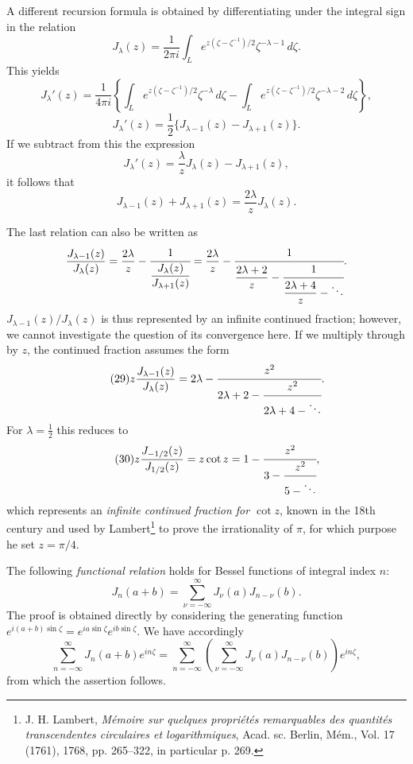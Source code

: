 A different recursion formula is obtained by differentiating under the integral sign in the relation
\[
J_\lambda(z)=\frac1{2\pi i}\int_L e^{z(\zeta-\zeta^{-1})/2}\zeta^{-\lambda-1}\,d\zeta.
\]
This yields
\[
J_\lambda'(z)=\frac1{4\pi i}\left\{\int_L e^{z(\zeta-\zeta^{-1})/2}\zeta^{-\lambda}\,d\zeta
-\int_L e^{z(\zeta-\zeta^{-1})/2}\zeta^{-\lambda-2}\,d\zeta\right\},
\]
\begin{equation}\tag{27}
J_\lambda'(z)=\frac12\{J_{\lambda-1}(z)-J_{\lambda+1}(z)\}.
\end{equation}
If we subtract from this the expression
\[
J_\lambda'(z)=\frac\lambda zJ_\lambda(z)-J_{\lambda+1}(z),
\]
it follows that
\begin{equation}\tag{28}
J_{\lambda-1}(z)+J_{\lambda+1}(z)=\frac{2\lambda}{z}J_\lambda(z).
\end{equation}

The last relation can also be written as
\[
\frac{J_{\lambda-1}(z)}{J_\lambda(z)}
=\frac{2\lambda}{z}-\cfrac1{\dfrac{J_\lambda(z)}{J_{\lambda+1}(z)}}
=\frac{2\lambda}{z}-\cfrac1{\dfrac{2\lambda+2}{z}-\cfrac1{\dfrac{2\lambda+4}{z}-\ddots}}.
\]
$J_{\lambda-1}(z)/J_\lambda(z)$ is thus represented by an infinite continued fraction; however, we cannot investigate the question of its convergence here. If we multiply through by $z$, the continued fraction assumes the form
\begin{equation}\tag{29}
z\frac{J_{\lambda-1}(z)}{J_\lambda(z)}
=2\lambda-\cfrac{z^2}{2\lambda+2-\cfrac{z^2}{2\lambda+4-\ddots}}.
\end{equation}
For $\lambda=\tfrac12$ this reduces to
\begin{equation}\tag{30}
z\frac{J_{-1/2}(z)}{J_{1/2}(z)}=z\cot z
=1-\cfrac{z^2}{3-\cfrac{z^2}{5-\ddots}},
\end{equation}
which represents an \emph{infinite continued fraction for $\cot z$}, known in the 18th century and used by Lambert\footnote{J. H. Lambert, \emph{Mémoire sur quelques propriétés remarquables des quantités transcendentes circulaires et logarithmiques}, Acad. sc. Berlin, Mém., Vol. 17 (1761), 1768, pp. 265--322, in particular p. 269.} to prove the irrationality of $\pi$, for which purpose he set $z=\pi/4$.

The following \emph{functional relation} holds for Bessel functions of integral index $n$:
\begin{equation}\tag{31}
J_n(a+b)=\sum_{\nu=-\infty}^{\infty}J_\nu(a)J_{n-\nu}(b).
\end{equation}
The proof is obtained directly by considering the generating function $e^{i(a+b)\sin\zeta}=e^{ia\sin\zeta}e^{ib\sin\zeta}$. We have accordingly
\[
\sum_{n=-\infty}^{\infty}J_n(a+b)e^{in\zeta}
=\sum_{n=-\infty}^{\infty}\left(\sum_{\nu=-\infty}^{\infty}J_\nu(a)J_{n-\nu}(b)\right)e^{in\zeta},
\]
from which the assertion follows.

